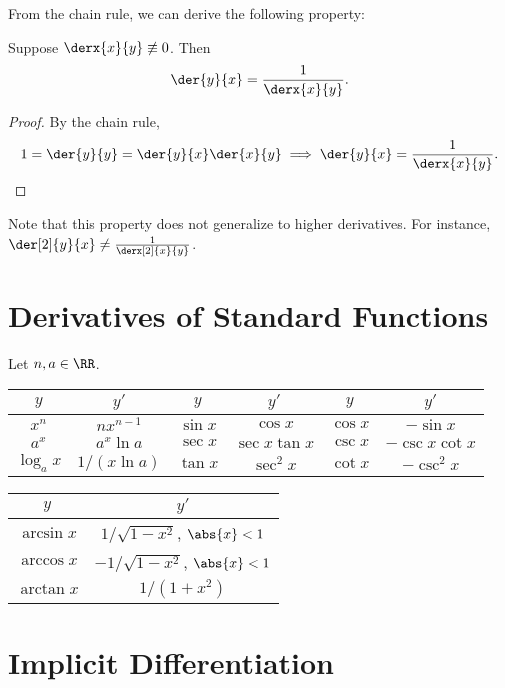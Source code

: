 From the chain rule, we can derive the following property:

\begin{proposition}
    Suppose $\derx{x}{y} \not\equiv 0$. Then \[\der{y}{x} = \frac1{\derx{x}{y}}.\]
\end{proposition}
\begin{proof}
    By the chain rule, \[1 = \der{y}{y} = \der{y}{x} \der{x}{y} \implies \der{y}{x} = \frac1{\derx{x}{y}}.\]
\end{proof}

Note that this property does not generalize to higher derivatives. For instance, $\der[2]{y}{x} \neq \frac1{\derx[2]{x}{y}}$.

\section{Derivatives of Standard Functions}

Let $n, a \in \RR$.

\begin{table}[H]
    \centering
    \begin{tabular}{|c|c|c|c|c|c|}
    \hline
    $y$ & $y'$ & $y$ & $y'$ & $y$ & $y'$ \\ \hline\hline
    $x^n$ & $n x^{n-1}$ & $\sin x$ & $\cos x$ & $\cos x$ & $-\sin x$\\ \hline
    $a^x$ & $a^x \ln a$ & $\sec x$ & $\sec x \tan x$ & $\csc x$ & $-\csc x \cot x$\\ \hline
    $\log_a x$ & $1/(x\ln a)$ & $\tan x$ & $\sec^2 x$ & $\cot x$ & $-\csc^2 x$\\ \hline
    \end{tabular}
\end{table}

\begin{table}[H]
    \centering
    \begin{tabular}{|c|c|}
    \hline
    $y$ & $y'$ \\ \hline\hline
    $\arcsin x$ & $1/\sqrt{1 - x^2}$, $\abs{x} < 1$ \\ \hline
    $\arccos x$ & $-1/\sqrt{1 - x^2}$, $\abs{x} < 1$ \\ \hline
    $\arctan x$ & $1/(1 + x^2)$ \\ \hline
    \end{tabular}
\end{table}

\section{Implicit Differentiation}

